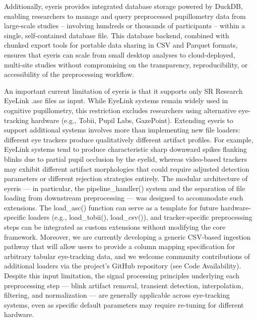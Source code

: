 Additionally, eyeris provides integrated database storage powered by DuckDB, enabling researchers to manage and query preprocessed pupillometry data from large-scale studies – involving hundreds or thousands of participants – within a single, self-contained database file. This database backend, combined with chunked export tools for portable data sharing in CSV and Parquet formats, ensures that eyeris can scale from small desktop analyses to cloud-deployed, multi-site studies without compromising on the transparency, reproducibility, or accessibility of the preprocessing workflow.

An important current limitation of eyeris is that it supports only SR Research EyeLink .asc files as input. While EyeLink systems remain widely used in cognitive pupillometry, this restriction excludes researchers using alternative eye-tracking hardware (e.g., Tobii, Pupil Labs, GazePoint). Extending eyeris to support additional systems involves more than implementing new file loaders: different eye trackers produce qualitatively different artifact profiles. For example, EyeLink systems tend to produce characteristic sharp downward spikes flanking blinks due to partial pupil occlusion by the eyelid, whereas video-based trackers may exhibit different artifact morphologies that could require adjusted detection parameters or different rejection strategies entirely. The modular architecture of eyeris — in particular, the pipeline\_handler() system and the separation of file loading from downstream preprocessing — was designed to accommodate such extensions. The load\_asc() function can serve as a template for future hardware-specific loaders (e.g., load\_tobii(), load\_csv()), and tracker-specific preprocessing steps can be integrated as custom extensions without modifying the core framework. Moreover, we are currently developing a generic CSV-based ingestion pathway that will allow users to provide a column mapping specification for arbitrary tabular eye-tracking data, and we welcome community contributions of additional loaders via the project's GitHub repository (see Code Availability). Despite this input limitation, the signal processing principles underlying each preprocessing step — blink artifact removal, transient detection, interpolation, filtering, and normalization — are generally applicable across eye-tracking systems, even as specific default parameters may require re-tuning for different hardware.

